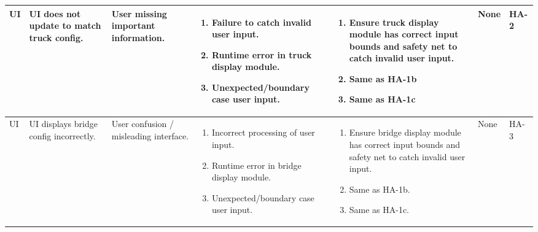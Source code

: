 \documentclass{article}
\begin{document}
\begin{landscape}
\begin{longtable}{|p{} | p{} | p{} | p{} | p{} | p{} | p{}|}
  UI & UI does not update to match truck config. & User missing important information. & 
  \begin{enumerate}[leftmargin=*, label={\alph*.}, itemsep=1pt, topsep=0pt, partopsep=0pt] 
    \item Failure to catch invalid user input.
    \item Runtime error in truck display module.
    \item Unexpected/boundary case user input.
  \end{enumerate} &
  \begin{enumerate}[leftmargin=*, label={\alph*.}, itemsep=1pt, topsep=0pt, partopsep=0pt] 
    \item Ensure truck display module has correct input bounds and safety net to catch invalid user input.
    \item Same as HA-1b
    \item Same as HA-1c
  \end{enumerate} & 
  None & HA-2 \\

  \hline

  UI & UI displays bridge config incorrectly. & User confusion / misleading interface. &
  \begin{enumerate}[leftmargin=*, label={\alph*.}, itemsep=1pt, topsep=0pt, partopsep=0pt] 
    \item Incorrect processing of user input.
    \item Runtime error in bridge display module.
    \item Unexpected/boundary case user input.
  \end{enumerate} &
  \begin{enumerate}[leftmargin=*, label={\alph*.}, itemsep=1pt, topsep=0pt, partopsep=0pt] 
    \item Ensure bridge display module has correct input bounds and safety net to catch invalid user input.
    \item Same as HA-1b.
    \item Same as HA-1c.
  \end{enumerate} & 
  None & HA-3 \\

  \hline


\end{longtable}
\end{landscape}
\end{document}
